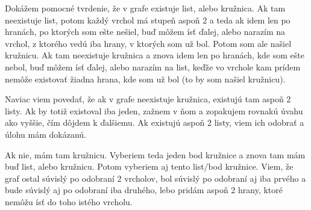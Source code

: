 
Dokážem pomocné tvrdenie, že v grafe existuje list, alebo kružnica. 
Ak tam neexistuje list, potom každý vrchol má stupeň aspoň 2 a teda 
ak idem len po hranách, po ktorých som ešte nešiel, buď môžem ísť 
ďalej, alebo narazím na vrchol, z ktorého vedú iba hrany, v ktorých 
som už bol. Potom som ale našiel kružnicu. Ak tam neexistuje 
kružnica a znova idem len po hranách, kde som ešte nebol, buď môžem 
ísť ďalej, alebo narazím na list, keďže vo vrchole kam prídem nemôže 
existovať žiadna hrana, kde som už bol (to by som našiel kružnicu). 

Naviac viem povedať, že ak v grafe neexistuje kružnica, existujú tam 
aspoň 2 listy. Ak by totiž existoval iba jeden, zažnem v ňom a 
zopakujem rovnakú úvahu ako vyššie, čím dôjdem k ďalšiemu. Ak existujú 
aspoň 2 listy, viem ich odobrať a úlohu mám dokázanú. 

Ak nie, mám tam 
kružnicu. Vyberiem teda jeden bod kružnice a znova tam mám buď list, 
alebo kružnicu. Potom vyberiem aj tento list/bod kružnice. Viem, že 
graf ostal súvislý po odobraní 2 vrcholov, bol súvislý po odobraní 
aj iba prvého a bude súvislý aj po odobraní iba druhého, lebo pridám 
aspoň 2 hrany, ktoré nemôžu ísť do toho istého vrcholu.

